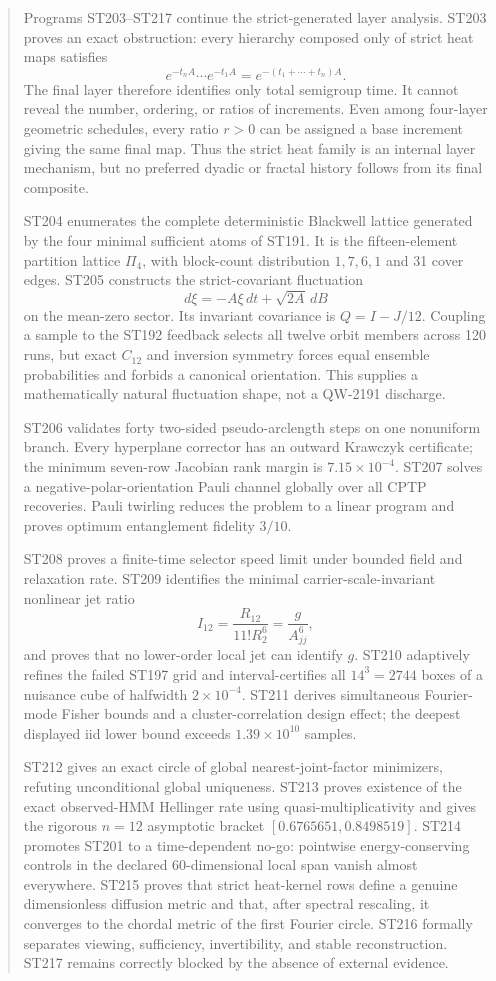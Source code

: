 \documentclass[11pt,a4paper]{article}
\begin{document}

\begin{abstract}
Programs ST203--ST217 continue the strict-generated layer analysis. ST203 proves an exact obstruction: every hierarchy composed only of strict heat maps satisfies
\[
e^{-t_nA}\cdots e^{-t_1A}=e^{-(t_1+\cdots+t_n)A}.
\]
The final layer therefore identifies only total semigroup time. It cannot reveal the number, ordering, or ratios of increments. Even among four-layer geometric schedules, every ratio $r>0$ can be assigned a base increment giving the same final map. Thus the strict heat family is an internal layer mechanism, but no preferred dyadic or fractal history follows from its final composite.

ST204 enumerates the complete deterministic Blackwell lattice generated by the four minimal sufficient atoms of ST191. It is the fifteen-element partition lattice $\Pi_4$, with block-count distribution $1,7,6,1$ and 31 cover edges. ST205 constructs the strict-covariant fluctuation
\[
d\xi=-A\xi\,dt+\sqrt{2A}\,dB
\]
on the mean-zero sector. Its invariant covariance is $Q=I-J/12$. Coupling a sample to the ST192 feedback selects all twelve orbit members across 120 runs, but exact $C_{12}$ and inversion symmetry forces equal ensemble probabilities and forbids a canonical orientation. This supplies a mathematically natural fluctuation shape, not a QW-2191 discharge.

ST206 validates forty two-sided pseudo-arclength steps on one nonuniform branch. Every hyperplane corrector has an outward Krawczyk certificate; the minimum seven-row Jacobian rank margin is $7.15\times10^{-4}$. ST207 solves a negative-polar-orientation Pauli channel globally over all CPTP recoveries. Pauli twirling reduces the problem to a linear program and proves optimum entanglement fidelity $3/10$.

ST208 proves a finite-time selector speed limit under bounded field and relaxation rate. ST209 identifies the minimal carrier-scale-invariant nonlinear jet ratio
\[
I_{12}=\frac{R_{12}}{11!R_2^6}=\frac{g}{A_{jj}^6},
\]
and proves that no lower-order local jet can identify $g$. ST210 adaptively refines the failed ST197 grid and interval-certifies all $14^3=2744$ boxes of a nuisance cube of halfwidth $2\times10^{-4}$. ST211 derives simultaneous Fourier-mode Fisher bounds and a cluster-correlation design effect; the deepest displayed iid lower bound exceeds $1.39\times10^{10}$ samples.

ST212 gives an exact circle of global nearest-joint-factor minimizers, refuting unconditional global uniqueness. ST213 proves existence of the exact observed-HMM Hellinger rate using quasi-multiplicativity and gives the rigorous $n=12$ asymptotic bracket $[0.6765651,0.8498519]$. ST214 promotes ST201 to a time-dependent no-go: pointwise energy-conserving controls in the declared 60-dimensional local span vanish almost everywhere. ST215 proves that strict heat-kernel rows define a genuine dimensionless diffusion metric and that, after spectral rescaling, it converges to the chordal metric of the first Fourier circle. ST216 formally separates viewing, sufficiency, invertibility, and stable reconstruction. ST217 remains correctly blocked by the absence of external evidence.


\end{abstract}
\end{document}
